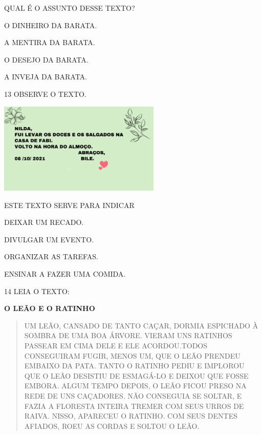 
QUAL É O ASSUNTO DESSE TEXTO?

\begin{escolha}
\item O DINHEIRO DA BARATA.

\item A MENTIRA DA BARATA.

\item O DESEJO DA BARATA.

\item A INVEJA DA BARATA.
\end{escolha}

\num{13} OBSERVE O TEXTO.

\includegraphics[width=3.04633in,height=1.71374in]{media/image220.png}

ESTE TEXTO SERVE PARA INDICAR

\begin{escolha}
\item DEIXAR UM RECADO.

\item DIVULGAR UM EVENTO.

\item ORGANIZAR AS TAREFAS.

\item ENSINAR A FAZER UMA COMIDA.
\end{escolha}

\num{14} LEIA O TEXTO:

\textbf{O LEÃO E O RATINHO}

\begin{quote}
UM LEÃO, CANSADO DE TANTO CAÇAR, DORMIA ESPICHADO À SOMBRA
DE UMA BOA ÁRVORE. VIERAM UNS RATINHOS PASSEAR EM CIMA DELE
E ELE ACORDOU.TODOS CONSEGUIRAM FUGIR, MENOS UM, QUE O LEÃO
PRENDEU EMBAIXO DA PATA. TANTO O RATINHO PEDIU E IMPLOROU
QUE O LEÃO DESISTIU DE ESMAGÁ-LO E DEIXOU QUE FOSSE EMBORA.
ALGUM TEMPO DEPOIS, O LEÃO FICOU PRESO NA REDE DE
UNS CAÇADORES. NÃO CONSEGUIA SE SOLTAR, E FAZIA A FLORESTA
INTEIRA TREMER COM SEUS URROS DE RAIVA.
NISSO, APARECEU O RATINHO. COM SEUS DENTES AFIADOS,
ROEU AS CORDAS E SOLTOU O LEÃO.

\end{quote}

